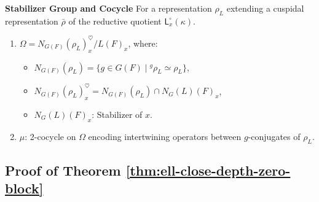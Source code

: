 \documentclass[american]{article}
\numberwithin{equation}{section}
\numberwithin{figure}{section}
\theoremstyle{plain}
\theoremstyle{definition}
\theoremstyle{remark}
\begin{document}
\vspace{1em}
\noindent \textbf{Stabilizer Group and Cocycle}
For a representation \(\rho_L\) extending a cuspidal representation \(\bar{\rho}\) of the reductive quotient \(\mathsf{L}_{x}^\circ(\kappa)\).
\begin{enumerate}
  \item \( \Omega = N_{G(F)}(\rho_L)^{\heartsuit}_{x} / L(F)_{x} \), where:
  \begin{itemize}
    \item \( N_{G(F)}(\rho_L) = \{g \in G(F) \mid {}^g\rho_L \simeq \rho_L\} \),
    \item \( N_{G(F)}(\rho_L)^{\heartsuit}_{x} = N_{G(F)}(\rho_L) \cap N_G(L)(F)_{x} \),
    \item \( N_G(L)(F)_{x} \): Stabilizer of \( x \).
  \end{itemize}
  \item \( \mu \): 2-cocycle on \( \Omega \) encoding intertwining operators between \( g \)-conjugates of \( \rho_L \).
\end{enumerate}

\vspace{1em}

\subsection{Proof of Theorem \ref{thm:ell-close-depth-zero-block}} 
\end{document}
